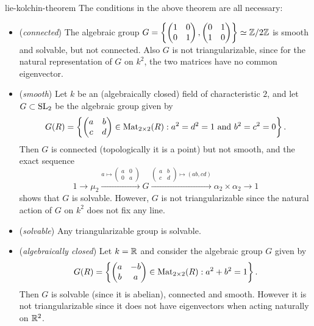 \begin{example}{lie-kolchin-theorem}
    The conditions in the above theorem are all necessary:
    \begin{itemize}
        \item (\textit{connected}) The algebraic group $G = \left\{ \begin{pmatrix} 1 & 0 \\ 0 & 1 \end{pmatrix}, \begin{pmatrix} 0 & 1 \\ 1 & 0 \end{pmatrix} \right\} \simeq \mathbb{Z}/2\mathbb{Z}$ is smooth and solvable, but not connected. Also $G$ is not triangularizable, since for the natural representation of $G$ on $k^2$, the two matrices have no common eigenvector.
        \item (\textit{smooth}) Let $k$ be an (algebraically closed) field of characteristic $2$, and let $G \subset \textup{SL}_2$ be the algebraic group given by
        \[ G(R) = \left\{ \begin{pmatrix} a & b \\ c & d \end{pmatrix} \in \textup{Mat}_{2 \times 2}(R) : a^2 = d^2 = 1 \textup{ and } b^2 = c^2 = 0 \right\} . \]
        Then $G$ is connected (topologically it is a point) but not smooth, and the exact sequence
        \[ 1 \to \mu_2 \xrightarrow{a \mapsto \left(\begin{smallmatrix} a & 0 \\ 0 & a \end{smallmatrix}\right)} G \xrightarrow{\left(\begin{smallmatrix} a & b \\ c & d \end{smallmatrix}\right) \mapsto (ab, cd)} \alpha_2 \times \alpha_2 \to 1 \]
        shows that $G$ is solvable. However, $G$ is not triangularizable since the natural action of $G$ on $k^2$ does not fix any line.
        \item (\textit{solvable}) Any triangularizable group is solvable.
        \item (\textit{algebraically closed}) Let $k = \mathbb{R}$ and consider the algebraic group $G$ given by
        \[ G(R) = \left\{ \begin{pmatrix} a & -b \\ b & a \end{pmatrix} \in \textup{Mat}_{2 \times 2}(R) : a^2 + b^2 = 1 \right\} . \]
        Then $G$ is solvable (since it is abelian), connected and smooth. However it is not triangularizable since it does not have eigenvectors when acting naturally on $\mathbb{R}^2$.
    \end{itemize}
\end{example}


